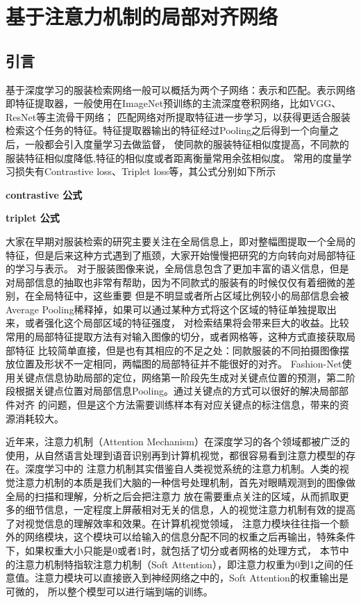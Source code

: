 \chapter{基于注意力机制的局部对齐网络}

\section{引言}
基于深度学习的服装检索网络一般可以概括为两个子网络：表示和匹配。表示网络即特征提取器，一般使用在ImageNet预训练的主流深度卷积网络，比如VGG、ResNet等主流骨干网络；
匹配网络对所提取特征进一步学习，以获得更适合服装检索这个任务的特征。特征提取器输出的特征经过Pooling之后得到一个向量之后，一般都会引入度量学习去做监督，
使同款的服装特征相似度提高，不同款的服装特征相似度降低,特征的相似度或者距离衡量常用余弦相似度。
常用的度量学习损失有Contrastive loss\cite{hadsell2006dimensionality}、Triplet loss\cite{schroff2015facenet}等，其公式分别如下所示

\textbf{contrastive 公式}

\textbf{triplet 公式}

大家在早期对服装检索的研究主要关注在全局信息上，即对整幅图提取一个全局的特征，但是后来这种方式遇到了瓶颈，大家开始慢慢把研究的方向转向对局部特征的学习与表示。
对于服装图像来说，全局信息包含了更加丰富的语义信息，但是对局部信息的抽取也非常有帮助，因为不同款式的服装有的时候仅仅有着细微的差别，在全局特征中，这些重要
但是不明显或者所占区域比例较小的局部信息会被Average Pooling稀释掉，如果可以通过某种方式将这个区域的特征单独提取出来，或者强化这个局部区域的特征强度，
对检索结果将会带来巨大的收益。比较常用的局部特征提取方法有对输入图像的切分\cite{varior2016siamese}，或者网格\cite{li2014deepreid}等，这种方式直接获取局部特征
比较简单直接，但是也有其相应的不足之处：同款服装的不同拍摄图像摆放位置及形状不一定相同，两幅图的局部特征并不能很好的对齐。
Fashion-Net使用关键点信息协助局部的定位，网络第一阶段先生成对关键点位置的预测，第二阶段根据关键点位置对局部信息Pooling。通过关键点的方式可以很好的解决局部部件对齐
的问题，但是这个方法需要训练样本有对应关键点的标注信息，带来的资源消耗较大。

近年来，注意力机制（Attention Mechanism）在深度学习的各个领域都被广泛的使用，从自然语言处理到语音识别再到计算机视觉，都很容易看到注意力模型的存在。深度学习中的
注意力机制其实借鉴自人类视觉系统的注意力机制。人类的视觉注意力机制的本质是我们大脑的一种信号处理机制，首先对眼睛观测到的图像做全局的扫描和理解，分析之后会把注意力
放在需要重点关注的区域，从而抓取更多的细节信息，一定程度上屏蔽相对无关的信息，人的视觉注意力机制有效的提高了对视觉信息的理解效率和效果。在计算机视觉领域，
注意力模块往往指一个额外的网络模块，这个模块可以给输入的信息分配不同的权重之后再输出，特殊条件下，如果权重大小只能是0或者1时，就包括了切分或者网格的处理方式，
本节中的注意力机制特指软注意力机制（Soft Attention），即注意力权重为0到1之间的任意值。注意力模块可以直接嵌入到神经网络之中的，Soft Attention的权重输出是可微的，
所以整个模型可以进行端到端的训练。

